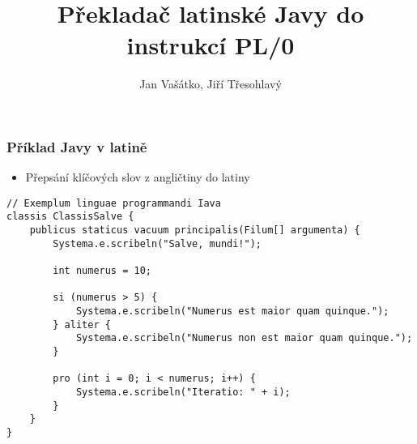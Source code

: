\documentclass[11pt]{beamer}
\author{Jan Vašátko, Jiří Třesohlavý}
\title{Překladač latinské Javy do instrukcí PL/0}
\institute[FAV]{Fakulta aplikovaných věd}
\begin{document}
\begin{frame}
\titlepage
\end{frame}


\begin{frame}[fragile]
\frametitle{Příklad Javy v latině}
\begin{itemize}
	\item Přepsání klíčových slov z angličtiny do latiny
\end{itemize}

\begin{lstlisting}
// Exemplum linguae programmandi Iava
classis ClassisSalve {
    publicus staticus vacuum principalis(Filum[] argumenta) {
        Systema.e.scribeln("Salve, mundi!");
        
        int numerus = 10;
        
        si (numerus > 5) {
            Systema.e.scribeln("Numerus est maior quam quinque.");
        } aliter {
            Systema.e.scribeln("Numerus non est maior quam quinque.");
        }
        
        pro (int i = 0; i < numerus; i++) {
            Systema.e.scribeln("Iteratio: " + i);
        }
    }
}
    \end{lstlisting}
\end{frame}
\end{document}
